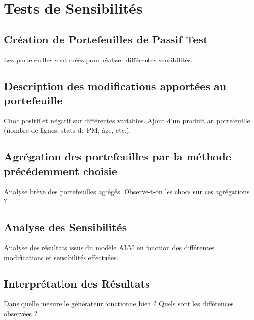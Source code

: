 \chapter{Tests de Sensibilités}
\section{Création de Portefeuilles de Passif Test}
Les portefeuilles sont créés pour réaliser différentes sensibilités.

\section{Description des modifications apportées au portefeuille}
Choc positif et négatif sur différentes variables. Ajout d’un produit au portefeuille (nombre de lignes, stats de PM, âge, etc.).

\section{Agrégation des portefeuilles par la méthode précédemment choisie}
Analyse brève des portefeuilles agrégés. Observe-t-on les chocs sur ces agrégations ?

\section{Analyse des Sensibilités}
Analyse des résultats issus du modèle ALM en fonction des différentes modifications et sensibilités effectuées.

\section{Interprétation des Résultats}
Dans quelle mesure le générateur fonctionne bien ? Quels sont les différences observées ?